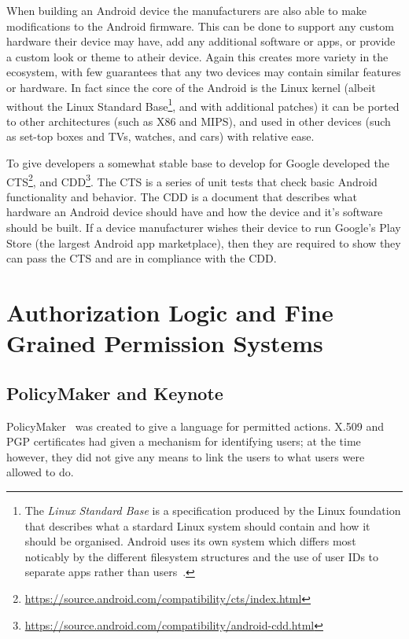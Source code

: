 \documentclass[thesis.tex]{subfiles}
\begin{document}
When building an Android device the manufacturers are also able to make
modifications to the Android firmware. This can be done to support any custom
hardware their device may have, add any additional software or apps, or provide
a custom look or theme to atheir device. Again this creates more variety in the
ecosystem, with few guarantees that any two devices may contain similar features
or hardware. In fact since the core of the Android is the Linux kernel (albeit
without the Linux Standard Base\footnote{The \emph{Linux Standard Base} is a
  specification produced by the Linux foundation that describes what a stardard
  Linux system should contain and how it should be organised. Android uses its own
  system which differs most noticably by the different filesystem structures and
  the use of user IDs to separate apps rather than users~\cite{linux_foundation_lsb_2015}.}, and with additional
patches) it can be ported to other architectures (such as X86 and MIPS), and
used in other devices (such as set-top boxes and TVs, watches, and cars) with
relative ease.

To give developers a somewhat stable base to develop for Google developed the
\ac{CTS}\footnote{\url{https://source.android.com/compatibility/cts/index.html}},
and \ac{CDD}\footnote{\url{https://source.android.com/compatibility/android-cdd.html}}.
The \ac{CTS} is a series of unit tests that check basic Android functionality and
behavior. The \ac{CDD} is a document that describes what hardware an Android device
should have and how the device and it's software should be built. If a device
manufacturer wishes their device to run Google's Play Store (the largest Android
app marketplace), then they are required to show they can pass the \ac{CTS} and are
in compliance with the \ac{CDD}.

\section{Authorization Logic and Fine Grained Permission Systems}
\label{sec:authorization-logic}


\subsection{PolicyMaker and Keynote}

PolicyMaker~\cite{blaze_decentralized_1996} was created to give a
language for permitted actions.  X.509 and PGP certificates had given
a mechanism for identifying users; at the time however, they did not
give any means to link the users to what users were allowed to do.
\end{document}
